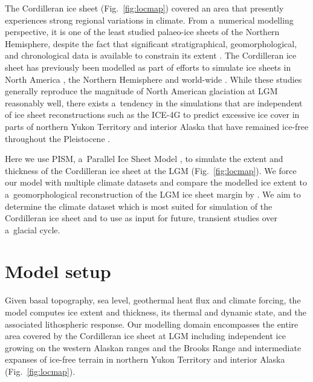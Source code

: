 \documentclass[tc, ms]{copernicus}
\begin{document}
The Cordilleran ice sheet (Fig.~\ref{fig:locmap}) covered an area that presently experiences strong regional variations in climate. From a~numerical modelling perspective, it is one of the least studied palaeo-ice sheets of the Northern Hemisphere, despite the fact that significant stratigraphical, geomorphological, and chronological data is available to constrain its extent \citep{jackson-clague-1991,porter-swanson-1998,dukrodkin-1999,dyke-2004,kaufman-manley-2004,kleman-etal-2010,stroeven-etal-2010,stroeven-etal-inpress,margold-etal-2011}. The Cordilleran ice sheet has previously been modelled as part of efforts to simulate ice sheets in North America \citep{marshall-clarke-1999,calov-etal-2002,tarasov-peltier-1997,tarasov-peltier-2004,gregoire-etal-2012}, the Northern Hemisphere \citep{huybrechts-tsiobbel-1996,greve-etal-1999,charbit-etal-2002,charbit-etal-2007,charbit-etal-2013,johnson-fastook-2002,rodgers-etal-2004,bintanja-etal-2005,zweck-huybrechts-2005,abeouchi-etal-2007} and world-wide \citep{yoshimori-etal-2001}. While these studies generally reproduce the magnitude of North American glaciation at LGM reasonably well, there exists a~tendency in the simulations that are independent of ice sheet reconstructions such as the ICE-4G to predict excessive ice cover in parts of northern Yukon Territory and interior Alaska that have remained ice-free throughout the Pleistocene \citep{dukrodkin-1999,kaufman-manley-2004}.

Here we use PISM, a~Parallel Ice Sheet Model \citep{web:pism}, to simulate the extent and thickness of the Cordilleran ice sheet at the LGM (Fig.~\ref{fig:locmap}). We force our model with multiple climate datasets and compare the modelled ice extent to a~geomorphological reconstruction of the LGM ice sheet margin by \citet{dyke-2004}. We aim to determine the climate dataset which is most suited for simulation of the Cordilleran ice sheet and to use as input for future, transient studies over a~glacial cycle.

\section{Model setup}
\label{sec:model}

Given basal topography, sea level, geothermal heat flux and climate forcing, the model computes ice extent and thickness, its thermal and dynamic state, and the associated lithospheric response. Our modelling domain encompasses the entire area covered by the Cordilleran ice sheet at LGM including independent ice growing on the western Alaskan ranges and the Brooks Range and intermediate expanses of ice-free terrain in northern Yukon Territory and interior Alaska (Fig.~\ref{fig:locmap}).
\end{document}
